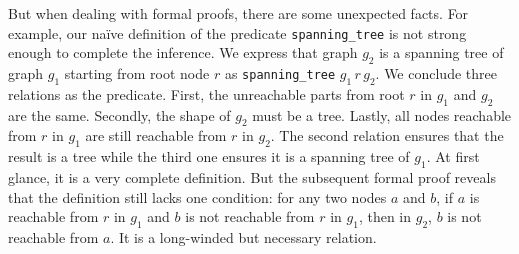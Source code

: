 But when dealing with formal proofs, there are some unexpected
facts. For example, our na\"ive definition of the
predicate \verb|spanning_tree| is not strong enough to complete the
inference. We express that graph $g_2$ is a spanning tree of graph
$g_1$ starting from root node $r$ as \verb|spanning_tree|
$g_1\,r\,g_2$. We conclude three relations as the predicate. First,
the unreachable parts from root $r$ in $g_1$ and $g_2$ are the
same. Secondly, the shape of $g_2$ must be a tree. Lastly, all nodes
reachable from $r$ in $g_1$ are still reachable from $r$ in $g_2$. The
second relation ensures that the result is a tree while the third one
ensures it is a spanning tree of $g_1$. At first glance, it is a very
complete definition. But the subsequent formal proof reveals that the
definition still lacks one condition: for any two nodes $a$ and $b$,
if $a$ is reachable from $r$ in $g_1$ and $b$ is not reachable from
$r$ in $g_1$, then in $g_2$, $b$ is not reachable from $a$. It is a
long-winded but necessary relation.
